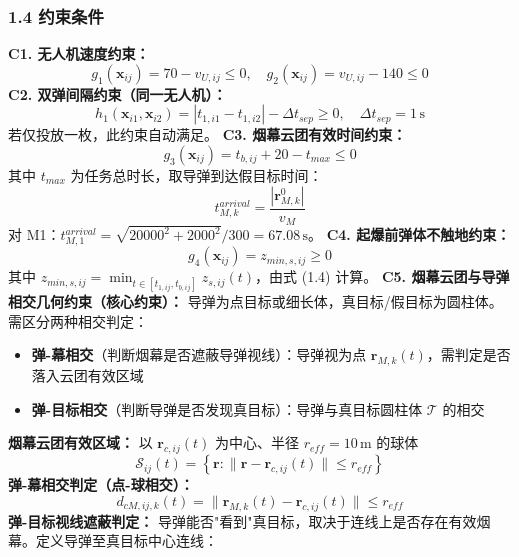 \documentclass{JXUSTmodeling}
\begin{document}
\subsubsection{1.4 约束条件}
\textbf{C1. 无人机速度约束：}
\begin{equation}
g_1(\mathbf{x}_{ij})=70-v_{U,ij}\leq 0,\quad g_2(\mathbf{x}_{ij})=v_{U,ij}-140\leq 0 \tag{1.11}
\end{equation}
\textbf{C2. 双弹间隔约束（同一无人机）：}
\begin{equation}
h_1(\mathbf{x}_{i1},\mathbf{x}_{i2})=|t_{1,i1}-t_{1,i2}|-\Delta t_{sep}\geq 0,\quad \Delta t_{sep}=1\,\mathrm{s} \tag{1.12}
\end{equation}
若仅投放一枚，此约束自动满足。
\textbf{C3. 烟幕云团有效时间约束：}
\begin{equation}
g_3(\mathbf{x}_{ij})=t_{b,ij}+20-t_{max}\leq 0 \tag{1.13}
\end{equation}
其中 $t_{max}$ 为任务总时长，取导弹到达假目标时间：
\begin{equation}
t_{M,k}^{arrival}=\frac{|\mathbf{r}_{M,k}^0|}{v_M} \tag{1.14}
\end{equation}
对 M1：$t_{M,1}^{arrival}=\sqrt{20000^2+2000^2}/300=67.08\,\mathrm{s}$。
\textbf{C4. 起爆前弹体不触地约束：}
\begin{equation}
g_4(\mathbf{x}_{ij})=z_{min,s,ij}\geq 0 \tag{1.15}
\end{equation}
其中 $z_{min,s,ij}=\min_{t\in[t_{1,ij},t_{b,ij}]}z_{s,ij}(t)$，由式 (1.4) 计算。
\textbf{C5. 烟幕云团与导弹相交几何约束（核心约束）：}
导弹为点目标或细长体，真目标/假目标为圆柱体。需区分两种相交判定：
\begin{itemize}
  \item \textbf{弹-幕相交}（判断烟幕是否遮蔽导弹视线）：导弹视为点 $\mathbf{r}_{M,k}(t)$，需判定是否落入云团有效区域
  \item \textbf{弹-目标相交}（判断导弹是否发现真目标）：导弹与真目标圆柱体 $\mathcal{T}$ 的相交
\end{itemize}
\textbf{烟幕云团有效区域：} 以 $\mathbf{r}_{c,ij}(t)$ 为中心、半径 $r_{eff}=10\,\mathrm{m}$ 的球体
\begin{equation}
\mathcal{S}_{ij}(t)=\left\{\mathbf{r}:\|\mathbf{r}-\mathbf{r}_{c,ij}(t)\|\leq r_{eff}\right\} \tag{1.16}
\end{equation}
\textbf{弹-幕相交判定（点-球相交）：}
\begin{equation}
d_{cM,ij,k}(t)=\|\mathbf{r}_{M,k}(t)-\mathbf{r}_{c,ij}(t)\|\leq r_{eff} \tag{1.17}
\end{equation}
\textbf{弹-目标视线遮蔽判定：} 导弹能否"看到"真目标，取决于连线上是否存在有效烟幕。定义导弹至真目标中心连线：
\end{document}
